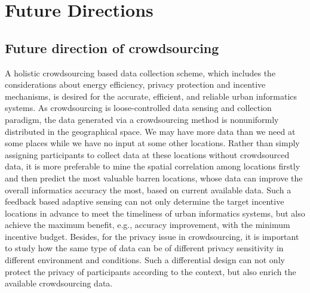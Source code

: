 
\section{Future Directions}


\subsection{Future direction of crowdsourcing}

A holistic crowdsourcing based data collection scheme, which includes the considerations about energy efficiency, privacy protection and incentive mechanisms, is desired for the accurate, efficient, and reliable urban informatics systems. As crowdsourcing is loose-controlled data sensing and collection paradigm, the data generated via a crowdsourcing method is nonuniformly distributed in the geographical space. We may have more data than we need at some places while we have no input at some other locations. Rather than simply assigning participants to collect data at these locations without crowdsourced data, it is more preferable to mine the spatial correlation among locations firstly and then predict the most valuable barren locations, whose data can improve the overall informatics accuracy the most, based on current available data. Such a feedback based adaptive sensing can not only determine the target incentive locations in advance to meet the timeliness of urban informatics systems, but also achieve the maximum benefit, e.g., accuracy improvement, with the minimum incentive budget. Besides, for the privacy issue in crowdsourcing, it is important to study how the same type of data can be of different privacy sensitivity in different environment and conditions. Such a differential design can not only protect the privacy of participants according to the context, but also enrich the available crowdsourcing data.

